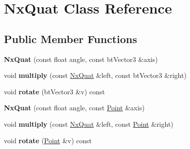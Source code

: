 \hypertarget{class_nx_quat}{\section{Nx\+Quat Class Reference}
\label{class_nx_quat}
}
\subsection*{Public Member Functions}
\begin{DoxyCompactItemize}
\item 
\hypertarget{class_nx_quat_ae0985273f52fce7bcacf58c970b41a1b}{{\bfseries Nx\+Quat} (const float angle, const bt\+Vector3 \&axis)}\label{class_nx_quat_ae0985273f52fce7bcacf58c970b41a1b}

\item 
\hypertarget{class_nx_quat_a83bcc41a2d17b7640edd100730c7e77e}{void {\bfseries multiply} (const \hyperlink{class_nx_quat}{Nx\+Quat} \&left, const bt\+Vector3 \&right)}\label{class_nx_quat_a83bcc41a2d17b7640edd100730c7e77e}

\item 
\hypertarget{class_nx_quat_a82339dc33aa07ca20028fa44263a5fd1}{void {\bfseries rotate} (bt\+Vector3 \&v) const }\label{class_nx_quat_a82339dc33aa07ca20028fa44263a5fd1}

\item 
\hypertarget{class_nx_quat_a32f34e45633b7b0e2a74be4519605ae7}{{\bfseries Nx\+Quat} (const float angle, const \hyperlink{class_point}{Point} \&axis)}\label{class_nx_quat_a32f34e45633b7b0e2a74be4519605ae7}

\item 
\hypertarget{class_nx_quat_aeb94cb6fdfa73e99e655d9e1aa5ebc90}{void {\bfseries multiply} (const \hyperlink{class_nx_quat}{Nx\+Quat} \&left, const \hyperlink{class_point}{Point} \&right)}\label{class_nx_quat_aeb94cb6fdfa73e99e655d9e1aa5ebc90}

\item 
\hypertarget{class_nx_quat_a932aac39bd317b8876428b7504099671}{void {\bfseries rotate} (\hyperlink{class_point}{Point} \&v) const }\label{class_nx_quat_a932aac39bd317b8876428b7504099671}

\end{DoxyCompactItemize}

